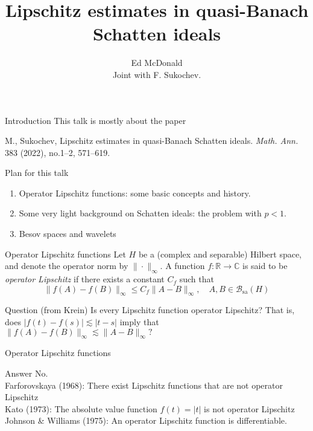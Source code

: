 \documentclass{beamer}
\newcommand\makebeamertitle{\frame{\maketitle}}%
\numberwithin{equation}{section}
\theoremstyle{plain}
\theoremstyle{plain}
\theoremstyle{definition}
\theoremstyle{plain}
\theoremstyle{plain}
\theoremstyle{definition}
\newcommand{\Rl}{\mathbb{R}}
\newcommand{\Cplx}{\mathbb{C}}
\newcommand{\Bc}{\mathcal{B}}
\newcommand{\sa}{\mathrm{sa}}
\begin{document}
\title[Lipschitz estimates for $p<1$]{Lipschitz estimates in quasi-Banach Schatten ideals}


\author[E. McDonald]{Ed McDonald\\
Joint with F. Sukochev.}



\makebeamertitle


\begin{frame}{Introduction}
This talk is mostly about the paper
\begin{center}
M., Sukochev, Lipschitz estimates in quasi-Banach Schatten ideals.
\emph{Math. Ann.} 383 (2022), no.1--2, 571--619.
\end{center}
\end{frame}

\begin{frame}{Plan for this talk}
    \begin{enumerate}
        \item{} Operator Lipschitz functions: some basic concepts and history.
        \item{} Some very light background on Schatten ideals: the problem with $p<1.$
        \item{} Besov spaces and wavelets
    \end{enumerate}
\end{frame}

\begin{frame}{Operator Lipschitz functions}
    Let $H$ be a (complex and separable) Hilbert space, and denote
    the operator norm by $\|\cdot\|_\infty$. A function $f:\Rl\to \Cplx$
    is said to be \emph{operator Lipschitz} if there exists a constant $C_f$ such that
    \begin{equation*}
        \|f(A)-f(B)\|_\infty \leq C_f\|A-B\|_\infty,\quad A,B\in \Bc_{\sa}(H)
    \end{equation*}
    \begin{block}{Question (from Krein)}
        Is every Lipschitz function operator Lipschitz?
        \pause
        That is, does $|f(t)-f(s)|\lesssim |t-s|$ imply that $\|f(A)-f(B)\|_{\infty} \lesssim \|A-B\|_{\infty}?$
    \end{block}
\end{frame}


\begin{frame}{Operator Lipschitz functions}
    \begin{block}{Answer}
        No.\\\pause
        Farforovskaya (1968): There exist Lipschitz functions that are not operator Lipschitz\\\pause
        Kato (1973): The absolute value function $f(t) = |t|$ is not operator Lipschitz\\\pause
        Johnson \& Williams (1975): An operator Lipschitz function is differentiable.
    \end{block}
\end{frame}
\end{document}
